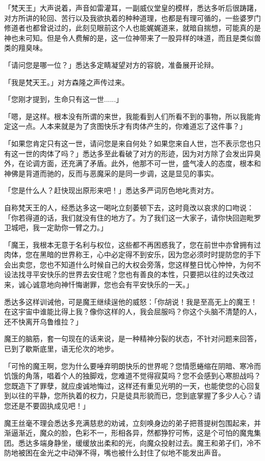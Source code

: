 \documentclass[12pt,twoside,openany]{book}
\begin{document}
「梵天王」大声说着，声音如雷灌耳，一副威仪堂皇的模样，悉达多听后很踌躇，对方所讲的轮回、苦行以及我欲执着的种种道理，也都是有理可循的，一些婆罗门修道者也都曾说过的，此刻见眼前这个人也能娓娓道来，就暗自揣想，可能真的是神也未可知。但是令人费解的是，这一位神带来了一股异样的味道，而且是类似兽类的羶臭味。

「请问您是哪一位？」悉达多定睛凝望对方的容貌，准备展开论辩。

「我是梵天王。」对方森隆之声传过来。

「您刚才提到，生命只有这一世......」

「嗯，是这样。根本没有所谓的来世，我能看到人们所看不到的事物，所以我能肯定这一点。人本来就是为了贪图快乐才有肉体产生的，你难道忘了这件事？」

「如果您肯定只有这一世，请问您是来自何处？如果您来自人世，岂不表示您也只有这一世的肉体了吗？」悉达多至此看破了对方的形迹，因为对方除了会发出异臭外，在论调方面，还充满了矛盾。此外，他那不可一世，盛气凌人的态度，根本和神佛是背道而驰的，反而与恶魔采的是同一步调，这是显见的事实。

「您是什么人？赶快现出原形来吧！」悉达多严词厉色地叱责对方。

自称梵天王的人，经悉达多这一喝叱立刻萎顿下去，这时竟改以哀求的口吻说：「你若得道的话，我们就没有住的地方了。为了我们这一大家子，请你快回迦毗罗卫城吧，我一定助你一臂之力。」

「魔王，我根本无意于名利与权位，这些都不再困惑我了，您在前世中亦曾拥有过肉体，您在黑暗的世界称王，心中必定得不到安乐，因为您必须时时提防您的手下会出卖您，您也不知道什么时候自己的大权会旁落，您这样整日忧心忡忡，为何不设法找寻平安快乐的世界去安住呢？您也有善良的本性，只要把以往的过失改过来，诚心诚意地向神忏悔谢罪，您也会有平安快乐的一天。」

悉达多这样训诫他，可是魔王继续逞他的威怒：「你胡说！我是至高无上的魔王！在这宇宙中谁能比得上我？像你这样的人，我会屈服吗？你这个头脑不清楚的人，还不快离开乌鲁维拉？」

魔王的脑筋，套一句现在的话来说，是一种精神分裂的状态，不针对问题来回答，已到了歇斯底里，语无伦次的地步。

「可怜的魔王啊，您为什么要唾弃明朗快乐的世界呢？您情愿蜷缩在阴暗、寒冷而饥饿的角落，唱着个人的独脚戏，您难道不觉得寂莫吗？您不会感到心寒胆战吗？您既造下了罪孽，就应虔诚地悔过，这样还有重见光明的一天，也能使您的心回复到以往的平静，您所执着的权力，只是徒具形貌而已，您到底掌握了多少人心？请您还是不要固执成见吧！」

魔王丝毫不理会悉达多充满慈悲的劝诫，立刻唤身边的弟子把菩提树包围起来，并渐逼渐近，魔众的脸，色彩不一，形相各异，然都狰狞可怖，这是个可怕的魔鬼集团。悉达多端身静坐，缓缓放出柔和的光，向魔众投射过去。魔王和弟子们，冷不防地被困在金光之中动弹不得，嘴也被什么封住了似地不能发出声音。
\end{document}
